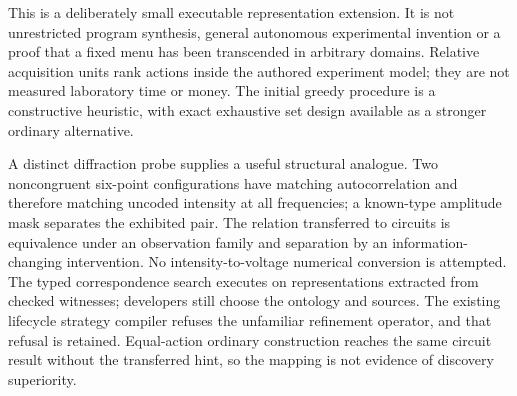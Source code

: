 \documentclass[10pt,letterpaper]{article}
\begin{document}
This is a deliberately small executable representation extension. It is not unrestricted program synthesis, general autonomous experimental invention or a proof that a fixed menu has been transcended in arbitrary domains. Relative acquisition units rank actions inside the authored experiment model; they are not measured laboratory time or money. The initial greedy procedure is a constructive heuristic, with exact exhaustive set design available as a stronger ordinary alternative.\par
A distinct diffraction probe supplies a useful structural analogue. Two noncongruent six-point configurations have matching autocorrelation and therefore matching uncoded intensity at all frequencies; a known-type amplitude mask separates the exhibited pair. The relation transferred to circuits is equivalence under an observation family and separation by an information-changing intervention. No intensity-to-voltage numerical conversion is attempted. The typed correspondence search executes on representations extracted from checked witnesses; developers still choose the ontology and sources. The existing lifecycle strategy compiler refuses the unfamiliar refinement operator, and that refusal is retained. Equal-action ordinary construction reaches the same circuit result without the transferred hint, so the mapping is not evidence of discovery superiority.\par
\end{document}
